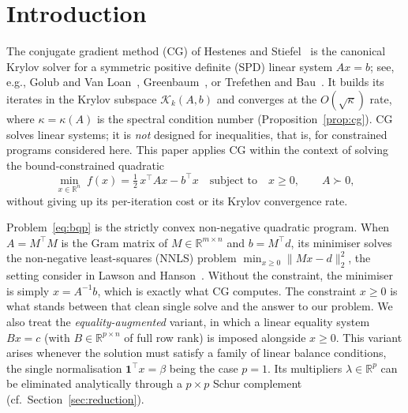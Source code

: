 \section{Introduction}

The conjugate gradient method (CG) of Hestenes and Stiefel~\cite{hestenes1952} is the
canonical Krylov solver for a symmetric positive definite (SPD) linear system $A x = b$;
see, e.g., Golub and Van Loan~\cite{golub2013}, Greenbaum~\cite{greenbaum1997}, or Trefethen
and Bau~\cite{trefethenbau1997}. It builds its iterates in the Krylov subspace
$\mathcal{K}_k(A, b)$ and converges at the $O(\sqrt\kappa)$ rate, where $\kappa = \kappa(A)$
is the spectral condition number (Proposition~\ref{prop:cg}). CG solves linear systems; it is \emph{not} designed for inequalities, that is, for constrained programs considered here. This paper applies CG within the context of solving the bound-constrained quadratic
\begin{equation}\label{eq:bqp}
  \min_{x \in \mathbb{R}^n}\; f(x) = \tfrac{1}{2}\,x^\top A x - b^\top x
  \quad\text{subject to}\quad x \geq 0,
  \qquad A \succ 0,
\end{equation}
without giving up its per-iteration cost or its Krylov convergence rate.

Problem~\eqref{eq:bqp} is the strictly convex non-negative quadratic program. When
$A = M^\top M$ is the Gram matrix of $M \in \mathbb{R}^{m\times n}$ and $b = M^\top d$, its minimiser solves the non-negative least-squares (NNLS) problem
$\min_{x\geq 0}\|Mx - d\|_2^2$, the setting consider in Lawson and Hanson~\cite{lawson1974}. Without the constraint, the minimiser is simply $x = A^{-1}b$, which is exactly what CG computes. The constraint $x \geq 0$ is what stands between that clean single solve and the answer to our problem. We also treat
the \emph{equality-augmented} variant, in which a linear equality system $Bx = c$ (with
$B \in \mathbb{R}^{p\times n}$ of full row rank) is imposed alongside $x \geq 0$. This variant
arises whenever the solution must satisfy a family of linear balance conditions, the single
normalisation $\mathbf{1}^\top x = \beta$ being the case $p=1$. Its multipliers
$\lambda \in \mathbb{R}^p$ can be eliminated analytically through a $p\times p$ Schur
complement (cf.\ Section~\ref{sec:reduction}).

